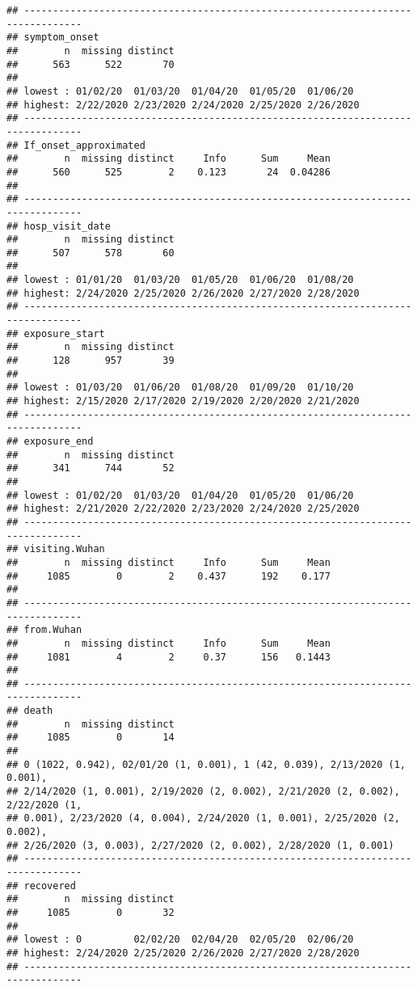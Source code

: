 \documentclass[
]{article}
\begin{document}
\begin{verbatim}
## --------------------------------------------------------------------------------
## symptom_onset 
##        n  missing distinct 
##      563      522       70 
## 
## lowest : 01/02/20  01/03/20  01/04/20  01/05/20  01/06/20 
## highest: 2/22/2020 2/23/2020 2/24/2020 2/25/2020 2/26/2020
## --------------------------------------------------------------------------------
## If_onset_approximated 
##        n  missing distinct     Info      Sum     Mean 
##      560      525        2    0.123       24  0.04286 
## 
## --------------------------------------------------------------------------------
## hosp_visit_date 
##        n  missing distinct 
##      507      578       60 
## 
## lowest : 01/01/20  01/03/20  01/05/20  01/06/20  01/08/20 
## highest: 2/24/2020 2/25/2020 2/26/2020 2/27/2020 2/28/2020
## --------------------------------------------------------------------------------
## exposure_start 
##        n  missing distinct 
##      128      957       39 
## 
## lowest : 01/03/20  01/06/20  01/08/20  01/09/20  01/10/20 
## highest: 2/15/2020 2/17/2020 2/19/2020 2/20/2020 2/21/2020
## --------------------------------------------------------------------------------
## exposure_end 
##        n  missing distinct 
##      341      744       52 
## 
## lowest : 01/02/20  01/03/20  01/04/20  01/05/20  01/06/20 
## highest: 2/21/2020 2/22/2020 2/23/2020 2/24/2020 2/25/2020
## --------------------------------------------------------------------------------
## visiting.Wuhan 
##        n  missing distinct     Info      Sum     Mean 
##     1085        0        2    0.437      192    0.177 
## 
## --------------------------------------------------------------------------------
## from.Wuhan 
##        n  missing distinct     Info      Sum     Mean 
##     1081        4        2     0.37      156   0.1443 
## 
## --------------------------------------------------------------------------------
## death 
##        n  missing distinct 
##     1085        0       14 
## 
## 0 (1022, 0.942), 02/01/20 (1, 0.001), 1 (42, 0.039), 2/13/2020 (1, 0.001),
## 2/14/2020 (1, 0.001), 2/19/2020 (2, 0.002), 2/21/2020 (2, 0.002), 2/22/2020 (1,
## 0.001), 2/23/2020 (4, 0.004), 2/24/2020 (1, 0.001), 2/25/2020 (2, 0.002),
## 2/26/2020 (3, 0.003), 2/27/2020 (2, 0.002), 2/28/2020 (1, 0.001)
## --------------------------------------------------------------------------------
## recovered 
##        n  missing distinct 
##     1085        0       32 
## 
## lowest : 0         02/02/20  02/04/20  02/05/20  02/06/20 
## highest: 2/24/2020 2/25/2020 2/26/2020 2/27/2020 2/28/2020
## --------------------------------------------------------------------------------

\end{verbatim}
\end{document}
